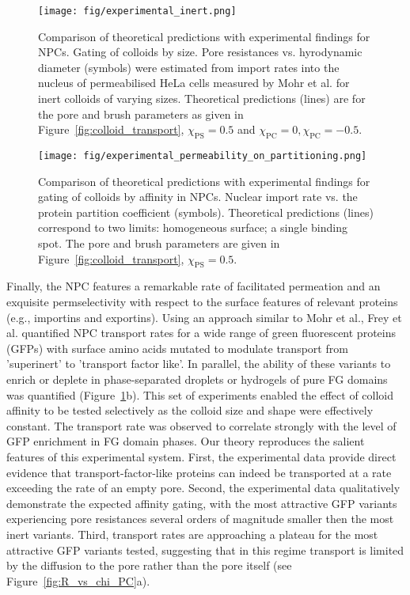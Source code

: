 \documentclass[12pt, a4paper]{article}
\begin{document}
\begin{figure}
    \centering
    \texttt{[image: fig/experimental\_inert.png]}
    \caption{
    Comparison of theoretical predictions with experimental findings for NPCs. Gating of colloids by size.
    Pore resistances vs. hyrodynamic diameter (symbols) were estimated from import rates into the nucleus of permeabilised HeLa cells measured by Mohr et al. for inert colloids of varying sizes.
    Theoretical predictions (lines) are for the pore and brush parameters as given in Figure~\ref{fig:colloid_transport}, $\chi_{\text{PS}} = 0.5$ and $\chi_{\text{PC}} = 0, \chi_{\text{PC}} = -0.5$.
    }
    \label{fig:NPC_comparison}
\end{figure}

\begin{figure}
    \centering
    \texttt{[image: fig/experimental\_permeability\_on\_partitioning.png]}
    \caption{
    Comparison of theoretical predictions with experimental findings for gating of colloids by affinity in NPCs.
    Nuclear import rate vs. the protein partition coefficient (symbols).
    Theoretical predictions (lines) correspond to two limits: homogeneous surface; a single binding spot. The pore and brush parameters are given in Figure~\ref{fig:colloid_transport}, $\chi_{\text{PS}} = 0.5$.
    }
    \label{fig:NPC_attr_comparison}
\end{figure}

Finally, the NPC features a remarkable rate of facilitated permeation and an exquisite permselectivity with respect to the surface features of relevant proteins (e.g., importins and exportins).
Using an approach similar to Mohr et al., Frey et al. quantified NPC transport rates for a wide range of green fluorescent proteins (GFPs) with surface amino acids mutated to modulate transport from 'superinert' to 'transport factor like'.
In parallel, the ability of these variants to enrich or deplete in phase-separated droplets or hydrogels of pure FG domains was quantified (Figure~\ref{fig:NPC_comparison}b).
This set of experiments enabled the effect of colloid affinity to be tested selectively as the colloid size and shape were effectively constant.
The transport rate was observed to correlate strongly with the level of GFP enrichment in FG domain phases.
Our theory reproduces the salient features of this experimental system.
First, the experimental data provide direct evidence that transport-factor-like proteins can indeed be transported at a rate exceeding the rate of an empty pore.
Second, the experimental data qualitatively demonstrate the expected affinity gating, with the most attractive GFP variants experiencing pore resistances several orders of magnitude smaller then the most inert variants.
Third, transport rates are approaching a plateau for the most attractive GFP variants tested, suggesting that in this regime transport is limited by the diffusion to the pore rather than the pore itself (see Figure~\ref{fig:R_vs_chi_PC}a).
\end{document}
